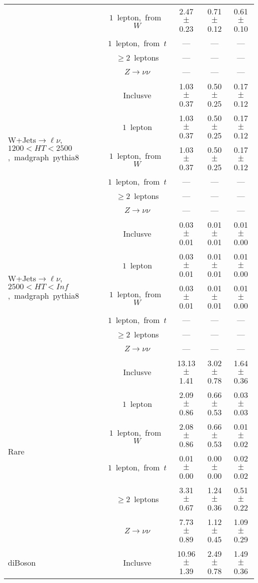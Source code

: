 \documentclass{article}
\begin{document}
\begin{longtable}{|l|c|c|c|c|}
 & $1$~lepton,~from~$W$  & 2.47 $\pm$ 0.23  & 0.71 $\pm$ 0.12  & 0.61 $\pm$ 0.10 \\* 
 & $1$~lepton,~from~$t$  & ---  & ---  & --- \\* 
 & $\ge2$~leptons  & ---  & ---  & --- \\* 
 & $Z\rightarrow\nu\nu$  & ---  & ---  & --- \\* 
\hline 
\multirow{6}{*}{W+Jets$\rightarrow\ell\nu$,~$1200<HT<2500$,~madgraph~pythia8} & Inclusve  & 1.03 $\pm$ 0.37  & 0.50 $\pm$ 0.25  & 0.17 $\pm$ 0.12 \\* 
 & $1$~lepton  & 1.03 $\pm$ 0.37  & 0.50 $\pm$ 0.25  & 0.17 $\pm$ 0.12 \\* 
 & $1$~lepton,~from~$W$  & 1.03 $\pm$ 0.37  & 0.50 $\pm$ 0.25  & 0.17 $\pm$ 0.12 \\* 
 & $1$~lepton,~from~$t$  & ---  & ---  & --- \\* 
 & $\ge2$~leptons  & ---  & ---  & --- \\* 
 & $Z\rightarrow\nu\nu$  & ---  & ---  & --- \\* 
\hline 
\multirow{6}{*}{W+Jets$\rightarrow\ell\nu$,~$2500<HT<Inf$,~madgraph~pythia8} & Inclusve  & 0.03 $\pm$ 0.01  & 0.01 $\pm$ 0.01  & 0.01 $\pm$ 0.00 \\* 
 & $1$~lepton  & 0.03 $\pm$ 0.01  & 0.01 $\pm$ 0.01  & 0.01 $\pm$ 0.00 \\* 
 & $1$~lepton,~from~$W$  & 0.03 $\pm$ 0.01  & 0.01 $\pm$ 0.01  & 0.01 $\pm$ 0.00 \\* 
 & $1$~lepton,~from~$t$  & ---  & ---  & --- \\* 
 & $\ge2$~leptons  & ---  & ---  & --- \\* 
 & $Z\rightarrow\nu\nu$  & ---  & ---  & --- \\* 
\hline 
\multirow{6}{*}{Rare} & Inclusve  & 13.13 $\pm$ 1.41  & 3.02 $\pm$ 0.78  & 1.64 $\pm$ 0.36 \\* 
 & $1$~lepton  & 2.09 $\pm$ 0.86  & 0.66 $\pm$ 0.53  & 0.03 $\pm$ 0.03 \\* 
 & $1$~lepton,~from~$W$  & 2.08 $\pm$ 0.86  & 0.66 $\pm$ 0.53  & 0.01 $\pm$ 0.02 \\* 
 & $1$~lepton,~from~$t$  & 0.01 $\pm$ 0.00  & 0.00 $\pm$ 0.00  & 0.02 $\pm$ 0.02 \\* 
 & $\ge2$~leptons  & 3.31 $\pm$ 0.67  & 1.24 $\pm$ 0.36  & 0.51 $\pm$ 0.22 \\* 
 & $Z\rightarrow\nu\nu$  & 7.73 $\pm$ 0.89  & 1.12 $\pm$ 0.45  & 1.09 $\pm$ 0.29 \\* 
\hline 
\multirow{6}{*}{diBoson} & Inclusve  & 10.96 $\pm$ 1.39  & 2.49 $\pm$ 0.78  & 1.49 $\pm$ 0.36 \\* 

\end{longtable}
\end{document}
